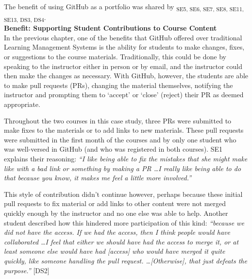 The benefit of using GitHub as a portfolio was shared by \textsubscript{SE5, SE6, SE7, SE8, SE11, SE13, DS3, DS4}. \\


\textbf{Benefit: Supporting Student Contributions to Course Content} \\
In the previous chapter, one of the benefits that GitHub offered over traditional Learning Management Systems is the ability for students to make changes, fixes, or suggestions to the course materials. Traditionally, this could be done by speaking to the instructor either in person or by email, and the instructor could then make the changes as necessary. With GitHub, however, the students are able to make pull requests (PRs), changing the material themselves, notifying the instructor and prompting them to `accept' or `close' (reject) their PR as deemed appropriate.

Throughout the two courses in this case study, three PRs were submitted to make fixes to the materials or to add links to new materials. These pull requests were submitted in the first month of the courses and by only one student who was well-versed in GitHub (and who was registered in both courses). SE1 explains their reasoning: \textit{``I like being able to fix the mistakes that she might make like with a bad link or something by making a PR \ldots I really like being able to do that because you know, it makes me feel a little more involved.''}

This style of contribution didn't continue however, perhaps because these initial pull requests to fix material or add links to other content were not merged quickly enough by the instructor and no one else was able to help. Another student described how this hindered more participation of this kind: \textit{``because we did not have the access. If we had the access, then I think people would have collaborated \ldots I feel that either we should have had the access to merge it, or at least someone else would have had [access] who would have merged it quite quickly, like someone handling the pull request. \ldots [Otherwise], that just defeats the purpose.''} [DS2]

